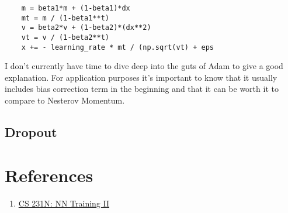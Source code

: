 \documentclass[12pt]{article}
\begin{document}
\begin{verbatim}
    m = beta1*m + (1-beta1)*dx
    mt = m / (1-beta1**t)
    v = beta2*v + (1-beta2)*(dx**2)
    vt = v / (1-beta2**t)
    x += - learning_rate * mt / (np.sqrt(vt) + eps
\end{verbatim}

I don't currently have time to dive deep into the guts of Adam to give a good explanation.
For application purposes it's important to know that it usually includes bias correction term 
in the beginning and that it can be worth it to compare to Nesterov Momentum. 


\subsection{Dropout}





\section{References}

\begin{enumerate}
    \item \href{https://cs231n.github.io/neural-networks-3/#sgd}{CS 231N: NN Training II}
\end{enumerate}
\end{document}
